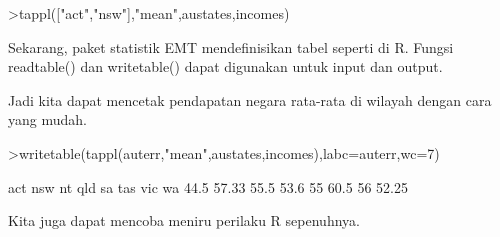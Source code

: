 \documentclass[a4paper,10pt]{article}
\begin{document}
\begin{eulernotebook}
\begin{eulercomment}
\begin{eulercomment}
\begin{eulercomment}
\begin{eulercomment}
\begin{eulercomment}
\begin{eulercomment}
\begin{eulercomment}
\begin{eulercomment}
\begin{eulercomment}
\begin{eulercomment}
\begin{eulercomment}
\begin{eulercomment}
\begin{eulercomment}
\begin{eulercomment}
\begin{eulercomment}
\begin{eulercomment}
\begin{eulercomment}
\begin{eulercomment}
\begin{eulercomment}
\begin{eulercomment}
\begin{eulercomment}
\begin{eulercomment}
\begin{eulercomment}
\begin{eulercomment}
\begin{eulercomment}
\begin{eulercomment}
\begin{eulercomment}
\begin{eulercomment}
\begin{eulercomment}
\begin{eulercomment}
\begin{eulercomment}
\begin{eulercomment}
\begin{eulercomment}
\begin{eulercomment}
\begin{eulercomment}
\end{eulercomment}
\begin{eulerprompt}
>tappl(["act","nsw"],"mean",austates,incomes)
\end{eulerprompt}
\begin{euleroutput}
  [44.5,  57.3333333333]
\end{euleroutput}
\begin{eulercomment}
Sekarang, paket statistik EMT mendefinisikan tabel seperti di R.
Fungsi readtable() dan writetable() dapat digunakan untuk input dan
output.

Jadi kita dapat mencetak pendapatan negara rata-rata di wilayah dengan
cara yang mudah.
\end{eulercomment}
\begin{eulerprompt}
>writetable(tappl(auterr,"mean",austates,incomes),labc=auterr,wc=7)
\end{eulerprompt}
\begin{euleroutput}
      act    nsw     nt    qld     sa    tas    vic     wa
     44.5  57.33   55.5   53.6     55   60.5     56  52.25
\end{euleroutput}
\begin{eulercomment}
Kita juga dapat mencoba meniru perilaku R sepenuhnya.


\end{eulercomment}
\end{eulercomment}
\end{eulercomment}
\end{eulercomment}
\end{eulercomment}
\end{eulercomment}
\end{eulercomment}
\end{eulercomment}
\end{eulercomment}
\end{eulercomment}
\end{eulercomment}
\end{eulercomment}
\end{eulercomment}
\end{eulercomment}
\end{eulercomment}
\end{eulercomment}
\end{eulercomment}
\end{eulercomment}
\end{eulercomment}
\end{eulercomment}
\end{eulercomment}
\end{eulercomment}
\end{eulercomment}
\end{eulercomment}
\end{eulercomment}
\end{eulercomment}
\end{eulercomment}
\end{eulercomment}
\end{eulercomment}
\end{eulercomment}
\end{eulercomment}
\end{eulercomment}
\end{eulercomment}
\end{eulercomment}
\end{eulercomment}
\end{eulernotebook}
\end{document}
